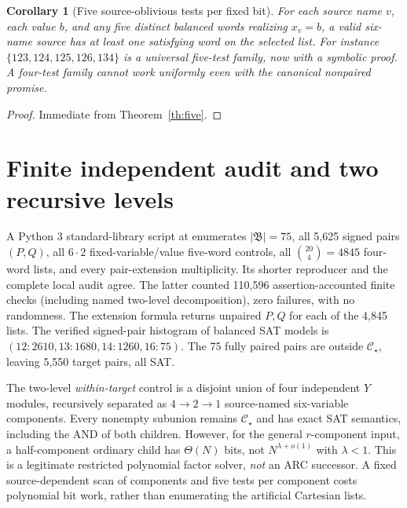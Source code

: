 \documentclass[11pt]{article}
\newtheorem{corollary}[theorem]{Corollary}
\newcommand{\CS}{\mathcal C_\star}
\begin{document}
\begin{corollary}[Five source-oblivious tests per fixed bit]
For each source name $v$, each value $b$, and any five distinct balanced words realizing $x_v=b$, a valid six-name source has at least one satisfying word on the selected list. For instance $\{123,124,125,126,134\}$ is a universal five-test family, now with a symbolic proof. A four-test family cannot work uniformly even with the canonical \emph{nonpaired} promise.
\end{corollary}
\begin{proof}
Immediate from Theorem~\ref{th:five}.
\end{proof}

\section{Finite independent audit and two recursive levels}
A Python 3 standard-library script at
enumerates $\lvert\mathfrak B\rvert=75$, all 5,625 signed pairs $(P,Q)$, all $6\cdot2$ fixed-variable/value five-word controls, all $\binom{20}4=4845$ four-word lists, and every pair-extension multiplicity. Its shorter reproducer and the complete local audit agree. The latter counted 110,596 assertion-accounted finite checks (including named two-level decomposition), zero failures, with no randomness. The extension formula returns unpaired $P,Q$ for each of the 4,845 lists. The verified signed-pair histogram of balanced SAT models is $(12:2610,13:1680,14:1260,16:75)$. The 75 fully paired pairs are outside $\CS$, leaving 5,550 target pairs, all SAT.

The two-level \emph{within-target} control is a disjoint union of four independent $Y$ modules, recursively separated as $4\to2\to1$ source-named six-variable components. Every nonempty subunion remains $\CS$ and has exact SAT semantics, including the AND of both children. However, for the general $r$-component input, a half-component ordinary child has $\Theta(N)$ bits, not $N^{\lambda+o(1)}$ with $\lambda<1$. This is a legitimate restricted polynomial factor solver, \emph{not} an ARC successor. A fixed source-dependent scan of components and five tests per component costs polynomial bit work, rather than enumerating the artificial Cartesian lists.
\end{document}
